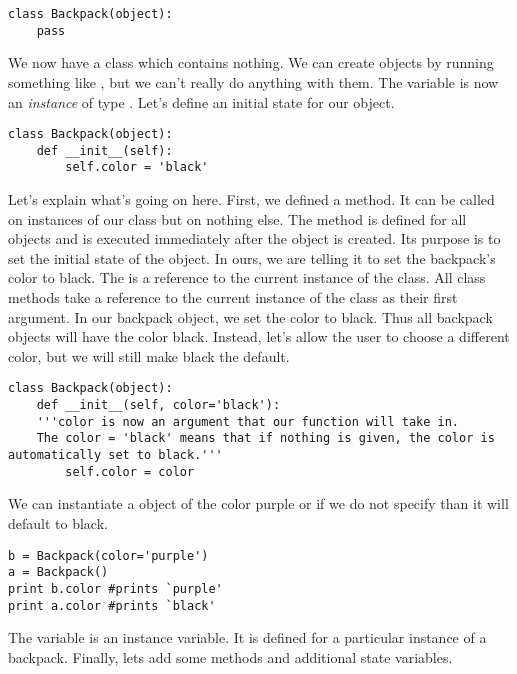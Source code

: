 \begin{lstlisting}
class Backpack(object):
    pass
\end{lstlisting}

We now have a class  which contains nothing.
We can create  objects by running something like , but we can't really do anything with them.
The variable  is now an \emph{instance} of type .
Let's define an initial state for our object.

\begin{lstlisting}
class Backpack(object):
    def __init__(self):
        self.color = 'black'
\end{lstlisting}

Let's explain what's going on here.
First, we defined a method.
It can be called on instances of our class but on nothing else.
The  method is defined for all objects and is executed immediately after the object is created.
Its purpose is to set the initial state of the object.
In ours, we are telling it to set the backpack's color to black.
The  is a reference to the current instance of the class.
All class methods take a reference to the current instance of the class as their first argument.
In our backpack object, we set the color to black.
Thus all backpack objects will have the color black.
Instead, let's allow the user to choose a different color, but we will still make black the default.

\begin{lstlisting}
class Backpack(object):
    def __init__(self, color='black'): 
    '''color is now an argument that our function will take in. 
    The color = 'black' means that if nothing is given, the color is automatically set to black.'''
        self.color = color
\end{lstlisting}

We can instantiate a  object of the color purple or if we do not specify than it will default to black.

\begin{lstlisting}
b = Backpack(color='purple')
a = Backpack()
print b.color #prints `purple'
print a.color #prints `black'
\end{lstlisting}

The variable  is an instance variable.
It is defined for a particular instance of a backpack.
Finally, lets add some methods and additional state variables.

